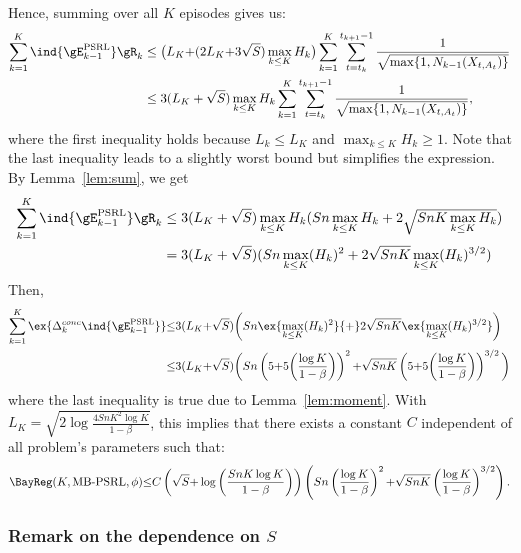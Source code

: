 Hence, summing over all $K$ episodes gives us:
\begin{align}
    \sum_{k=1}^{K} \ind{\gE_{k-1}^\text{PSRL}}\gR_k
    &\le  \big(L_K {+}(2L_K {+}3\sqrt{S})\max_{k\le K}H_k\big)\sum_{k=1}^K \sum_{t=t_k}^{t_{k+1}-1}\frac1{\sqrt{\max\{1,N_{k-1}(X_{t,A_t})\} }}
    \nonumber\\
    &\le  3(L_K+\sqrt{S})\max_{k\le K}H_k \sum_{k=1}^K \sum_{t=t_k}^{t_{k+1}-1}\frac1{\sqrt{\max\{1,N_{k-1}(X_{t,A_t})\} }},
    \label{eq:sum_not_E_k}
\end{align}
where the first inequality holds because $L_k\le L_K$ and $\max_{k\le K}H_k\ge1$. Note that the last inequality leads to a slightly worst bound but simplifies the expression. By Lemma~\ref{lem:sum}, we get
\begin{align*}
    \sum_{k=1}^{K} \ind{\gE_{k-1}^\text{PSRL}}\gR_k
    &\le 3(L_K+\sqrt{S})\max_{k\le K}H_k(Sn\max_{k\le K}H_k +2\sqrt{SnK \max_{k\le K}H_k}) \\
    &=3(L_K+\sqrt{S})(Sn\max_{k\le K}(H_k)^2 +2\sqrt{SnK} \max_{k\le K}(H_k)^{3/2})
    \nonumber
\end{align*}
Then, 
\begin{align}
    \sum_{k=1}^K\ex{\Delta_k^{conc} \ind{\gE_{k-1}^\text{PSRL}}}
    &{\le} 3(L_K {+}\sqrt{S})\bigg(Sn\ex{\max_{k\le K}(H_k)^2} {+}2\sqrt{SnK} \ex{\max_{k\le K}(H_k)^{3/2}}\bigg) \label{eq:proof_bound}\\
    &{\le} 3(L_K {+}\sqrt{S})\bigg(Sn\left(5 {+}5\bigg(\frac{\log K}{1-\beta}\bigg)\right)^2 {+}\sqrt{SnK}\left(5 {+}5\bigg(\frac{\log K}{1-\beta}\bigg)\right)^{3/2}\bigg) \nonumber
\end{align}
where the last inequality is true due to Lemma~\ref{lem:moment}.
With $L_K{=}\sqrt{2\log\frac{4SnK^2\log K}{1-\beta}}$, this implies that there exists a constant $C$ independent of all problem's parameters such that:
\begin{align*}
    \BayReg(K,\text{MB-PSRL},\phi) {\le} C\left(\sqrt{S}{+}\log\left(\frac{SnK\log K}{1-\beta}\right)\right) \left(Sn\left(\frac{\log K}{1-\beta}\right)^{2}
    {+}\sqrt{SnK}\left(\frac{\log K}{1-\beta}\right)^{3/2}\right).
\end{align*}

\subsubsection{Remark on the dependence on $S$}
\label{sssec:psrl_s}

